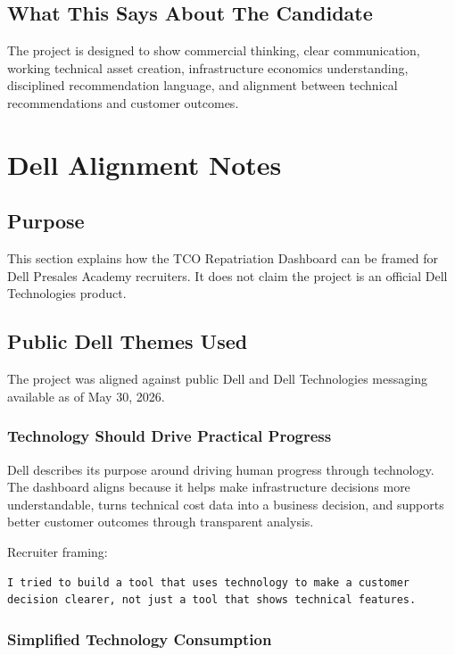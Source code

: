 \documentclass[11pt,a4paper]{article}
\begin{document}
\subsection{What This Says About The Candidate}

The project is designed to show commercial thinking, clear communication, working technical asset creation, infrastructure economics understanding, disciplined recommendation language, and alignment between technical recommendations and customer outcomes.

\section{Dell Alignment Notes}

\subsection{Purpose}

This section explains how the TCO Repatriation Dashboard can be framed for Dell Presales Academy recruiters. It does not claim the project is an official Dell Technologies product.

\subsection{Public Dell Themes Used}

The project was aligned against public Dell and Dell Technologies messaging available as of May 30, 2026.

\subsubsection{Technology Should Drive Practical Progress}

Dell describes its purpose around driving human progress through technology. The dashboard aligns because it helps make infrastructure decisions more understandable, turns technical cost data into a business decision, and supports better customer outcomes through transparent analysis.

Recruiter framing:

\begin{lstlisting}
I tried to build a tool that uses technology to make a customer decision clearer, not just a tool that shows technical features.
\end{lstlisting}

\subsubsection{Simplified Technology Consumption}
\end{document}
